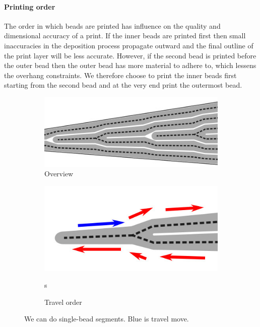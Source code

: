 \paragraph{Printing order}
The order in which beads are printed has influence on the quality and dimensional accuracy of a print.
If the inner beads are printed first then small inaccuracies in the deposition process propagate outward and the final outline of the print layer will be less accurate.
However, if the second bead is printed before the outer bead then the outer bead has more material to adhere to, which lessens the overhang constraints.
We therefore choose to print the inner beads first starting from the second bead and at the very end print the outermost bead.



\begin{figure}
\begin{subfigure}{0.45\columnwidth}
\includegraphics[width=\columnwidth]{sources/method/single_bead_strategy.jpg}
\caption{Overview}
\label{single_bead_strategy_overview}
\end{subfigure}
\begin{subfigure}{0.45\columnwidth}
\includegraphics[width=\columnwidth]{sources/method/single_bead_strategy_order.jpg}
\caption{Travel order}s
\end{subfigure}
\caption{We can do single-bead segments. Blue is travel move.}
\label{single_bead_strategy}
\end{figure}

